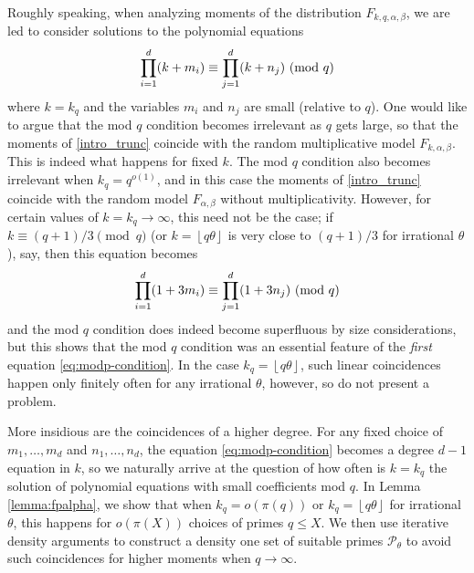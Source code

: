 \documentclass[12pt, a4paper]{amsart}
\theoremstyle{remark}
\newcommand{\floor}[1]{\left\lfloor#1\right\rfloor}
\renewcommand{\mod}[1]{{\ifmmode\text{\rm\ (mod~$#1$)}\else\discretionary{}{}{\hbox{ }}\rm(mod~$#1$)\fi}}
\newcommand{\cP}{\mathcal{P}}
\begin{document}
Roughly speaking, when analyzing moments of the distribution
$F_{k,q, \alpha, \beta}$, we are led to consider solutions to the polynomial
equations
\begin{equation}\label{eq:modp-condition}
    \prod_{i=1}^d (k + m_i) \equiv \prod_{j=1}^d (k + n_j) \mod q
\end{equation}
where $k = k_q$ and the variables $m_i$ and $n_j$ are
small (relative to $q$). One would like to argue that the mod
$q$ condition becomes irrelevant as $q$ gets large, so that the moments of \eqref{intro_trunc} coincide with the random multiplicative model $F_{k, \alpha, \beta}$. This is indeed what happens for fixed $k$. The mod $q$ condition also becomes irrelevant when $k_q = q^{o(1)}$, and in this case the moments of \eqref{intro_trunc} coincide with the random model $F_{\alpha, \beta}$ without multiplicativity. However, for certain values of $k=k_q\to\infty$, this need not be the case; if $k \equiv (q+1)/3 \pmod q$ (or $k = \floor{q\theta}$ is very close to $(q+1)/3$ for irrational $\theta$), say,  then this
equation becomes
\[
    \prod_{i=1}^d (1 + 3m_i) \equiv \prod_{j=1}^d (1 + 3n_j) \mod q
\]
and the mod $q$ condition does indeed become superfluous by size
considerations, but this shows that the mod $q$ condition was an
essential feature of the \emph{first} equation \eqref{eq:modp-condition}. In the case $k_q = \floor{q\theta}$,
such linear coincidences happen only finitely often for any irrational
$\theta$, however, so do not present a problem.

More insidious are the coincidences of a higher degree. \phantom{.}For any fixed choice
of $m_1, \ldots, m_d$ and $n_1, \ldots, n_d$, the equation
\eqref{eq:modp-condition} becomes a degree $d-1$ equation in $k$, so we naturally arrive at
the question of how often is $k = k_q$ the solution of
polynomial equations with small coefficients mod $q.$ In Lemma \ref{lemma:fpalpha}, we show that when $k_q = o(\pi(q))$ or $k_q = \floor{q\theta}$ for irrational $\theta$, this happens for $o(\pi(X))$ choices of primes $q\le X$. We then use iterative density arguments to construct a density one set of suitable primes $\cP_{\theta}$ to avoid such coincidences for higher moments when $q\to\infty.$ 
\end{document}
